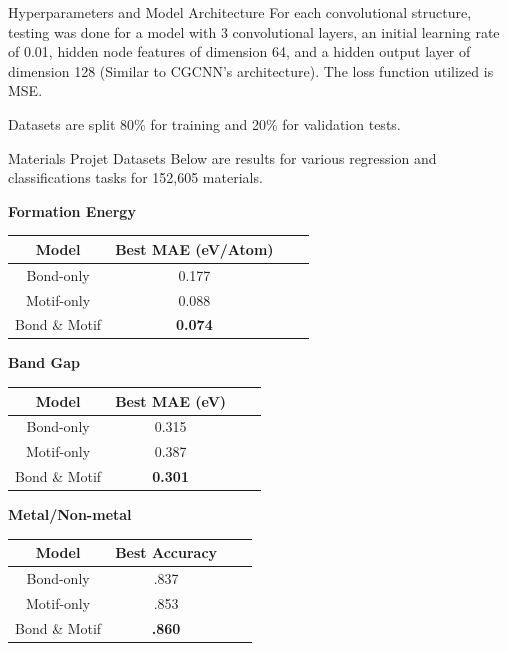 \documentclass[11pt]{beamer}
\begin{document}
\begin{frame}{Hyperparameters and Model Architecture}
For each convolutional structure, testing was done for a model with 3 convolutional layers, an initial learning rate of 0.01, hidden node features of dimension 64, and a hidden output layer of dimension 128 (Similar to CGCNN's architecture). The loss function utilized is MSE.

\medskip

Datasets are split 80\% for training and 20\% for validation tests. 

\end{frame}

\begin{frame}{Materials Projet Datasets}\small
Below are results for various regression and classifications tasks for 152,605 materials.
\begin{center}


\medskip

\textbf{Formation Energy}

\begin{tabular}{c|ccc}
Model & Best MAE (eV/Atom) \\
\hline
Bond-only & 0.177 \\
Motif-only &  0.088 \\
Bond \& Motif &  \textbf{0.074} \\
\end{tabular}

\medskip

\medskip

\textbf{Band Gap}

\begin{tabular}{c|ccc}
Model & Best MAE (eV)  \\
\hline
Bond-only & 0.315 \\
Motif-only & 0.387  \\
Bond \& Motif & \textbf{0.301 }\\
\end{tabular}

\medskip

\medskip

\textbf{Metal/Non-metal}

\begin{tabular}{c|ccc}
Model & Best Accuracy  \\
\hline
Bond-only & .837\\
Motif-only & .853\\
Bond \& Motif & \textbf{.860}\\
\end{tabular}
\end{center}
\end{frame}
\end{document}
